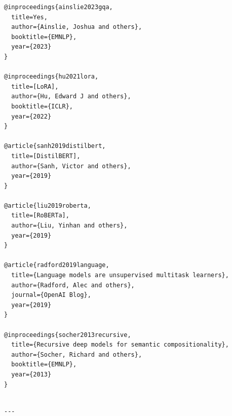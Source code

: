 \begin{lstlisting}
@inproceedings{ainslie2023gqa,
  title=Yes,
  author={Ainslie, Joshua and others},
  booktitle={EMNLP},
  year={2023}
}

@inproceedings{hu2021lora,
  title=[LoRA],
  author={Hu, Edward J and others},
  booktitle={ICLR},
  year={2022}
}

@article{sanh2019distilbert,
  title=[DistilBERT],
  author={Sanh, Victor and others},
  year={2019}
}

@article{liu2019roberta,
  title=[RoBERTa],
  author={Liu, Yinhan and others},
  year={2019}
}

@article{radford2019language,
  title={Language models are unsupervised multitask learners},
  author={Radford, Alec and others},
  journal={OpenAI Blog},
  year={2019}
}

@inproceedings{socher2013recursive,
  title={Recursive deep models for semantic compositionality},
  author={Socher, Richard and others},
  booktitle={EMNLP},
  year={2013}
}
\end{lstlisting}
\begin{lstlisting}

---
\end{lstlisting}